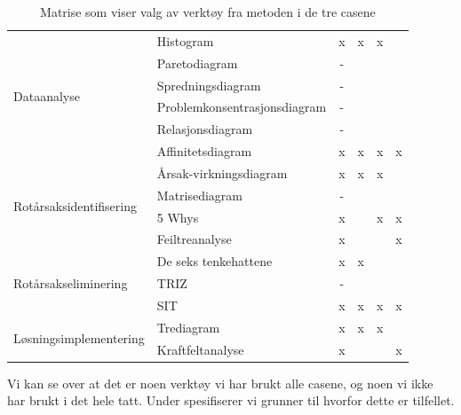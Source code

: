 \begin{table}[htbp]
\begin{tabular}{|l|l|c|r|r|r|}
    \hline
    \multicolumn{1}{|l|}{\multirow{6}[12]{*}{Dataanalyse}} & Histogram & x     & \multicolumn{1}{c|}{x} & \multicolumn{1}{c|}{x} &  \\
\cline{2-6}          & Paretodiagram & -    &       &        &  \\
\cline{2-6}          & Spredningsdiagram & -     &       &       &  \\
\cline{2-6}          & Problemkonsentrasjonsdiagram & -     &       &       &  \\
\cline{2-6}          & Relasjonsdiagram & -    &       &        &  \\
\cline{2-6}          & Affinitetsdiagram & x     & \multicolumn{1}{c|}{x} & \multicolumn{1}{c|}{x} & \multicolumn{1}{c|}{x} \\
    \hline
    \multicolumn{1}{|l|}{\multirow{4}[8]{*}{Rotårsaksidentifisering}} & Årsak-virkningsdiagram & x     & \multicolumn{1}{c|}{x} & \multicolumn{1}{c|}{x} &  \\
\cline{2-6}          & Matrisediagram & -     &       &       &  \\
\cline{2-6}          & 5 Whys & x     &       & \multicolumn{1}{c|}{x} & \multicolumn{1}{c|}{x} \\
\cline{2-6}          & Feiltreanalyse & x     &       &       & \multicolumn{1}{c|}{x} \\
    \hline
    \multicolumn{1}{|l|}{\multirow{3}[6]{*}{Rotårsakseliminering}} & De seks tenkehattene & x     & \multicolumn{1}{c|}{x} &     &  \\
\cline{2-6}          & TRIZ  & -     &       &       &  \\
\cline{2-6}          & SIT   & x     & \multicolumn{1}{c|}{x} & \multicolumn{1}{c|}{x} & \multicolumn{1}{c|}{x} \\
    \hline
    \multicolumn{1}{|l|}{\multirow{2}[4]{*}{Løsningsimplementering}} & Trediagram & x     & \multicolumn{1}{c|}{x} & \multicolumn{1}{c|}{x} &  \\
\cline{2-6}          & Kraftfeltanalyse & x     &       &       & \multicolumn{1}{c|}{x} \\
    \hline
    \end{tabular}%
  \caption[Matrise som viser valg av verktøy]{Matrise som viser valg av verktøy fra metoden i de tre casene}
  \label{tab:verktoymatrise}%
\end{table}%

Vi kan se over at det er noen verktøy vi har brukt alle casene, og noen vi ikke har brukt i det hele tatt. Under spesifiserer vi grunner til hvorfor dette er tilfellet.

